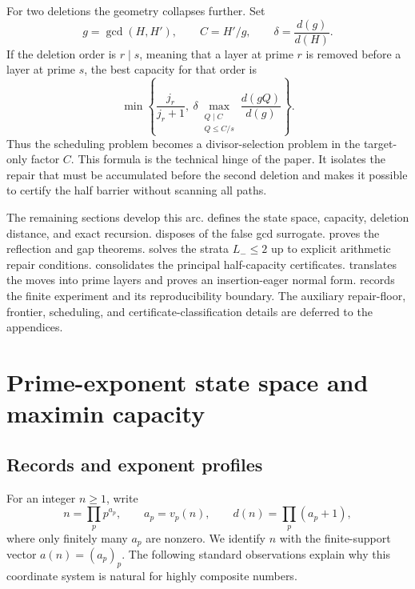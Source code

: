 \documentclass[11pt]{article}
\numberwithin{equation}{section}
\theoremstyle{blueplain}
\theoremstyle{bluedef}
\newcommand{\vpp}[2]{v_{#1}(#2)}
\begin{document}
For two deletions the geometry collapses further.  Set
\begin{equation}
 g=\gcd(H,H'),\qquad C=H'/g,\qquad
 \delta=\frac{d(g)}{d(H)}.
 \label{eq:gcd-target-intro}
\end{equation}
If the deletion order is $r\mid s$, meaning that a layer at prime $r$ is removed before a layer at prime $s$, the best capacity for that order is
\begin{equation}
 \min\left\{\frac{j_r}{j_r+1},\ \delta
 \max_{\substack{Q\mid C\\Q\le C/s}}
 \frac{d(gQ)}{d(g)}\right\}.
 \label{eq:l2-preview}
\end{equation}
Thus the scheduling problem becomes a divisor-selection problem in the target-only factor $C$.  This formula is the technical hinge of the paper.  It isolates the repair that must be accumulated before the second deletion and makes it possible to certify the half barrier without scanning all paths.

The remaining sections develop this arc.   defines the state space, capacity, deletion distance, and exact recursion.   disposes of the false gcd surrogate.   proves the reflection and gap theorems.   solves the strata $L_-\le2$ up to explicit arithmetic repair conditions.   consolidates the principal half-capacity certificates.   translates the moves into prime layers and proves an insertion-eager normal form.   records the finite experiment and its reproducibility boundary.  The auxiliary repair-floor, frontier, scheduling, and certificate-classification details are deferred to the appendices.

\section{Prime-exponent state space and maximin capacity}
\label{sec:framework}

\subsection{Records and exponent profiles}

For an integer $n\ge1$, write
\begin{equation}
 n=\prod_{p}p^{a_p},
 \qquad
 a_p=\vpp pn,
 \qquad
 d(n)=\prod_p(a_p+1),
 \label{eq:prime-profile}
\end{equation}
where only finitely many $a_p$ are nonzero.  We identify $n$ with the finite-support vector $a(n)=(a_p)_p$.  The following standard observations explain why this coordinate system is natural for highly composite numbers.
\end{document}
